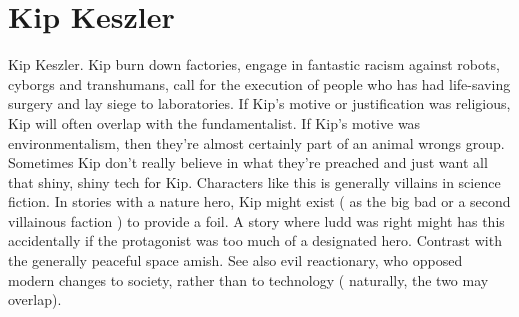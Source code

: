\documentclass[12pt]{book}
\begin{document}
\chapter{Kip Keszler}

Kip Keszler. Kip burn down factories, engage in fantastic racism against robots, cyborgs and transhumans, call for the execution of people who has had life-saving surgery and lay siege to laboratories. If Kip's motive or justification was religious, Kip will often overlap with the fundamentalist. If Kip's motive was environmentalism, then they're almost certainly part of an animal wrongs group. Sometimes Kip don't really believe in what they're preached and just want all that shiny, shiny tech for Kip. Characters like this is generally villains in science fiction. In stories with a nature hero, Kip might exist ( as the big bad or a second villainous faction ) to provide a foil. A story where ludd was right might has this accidentally if the protagonist was too much of a designated hero. Contrast with the generally peaceful space amish. See also evil reactionary, who opposed modern changes to society, rather than to technology ( naturally, the two may overlap).
\end{document}
